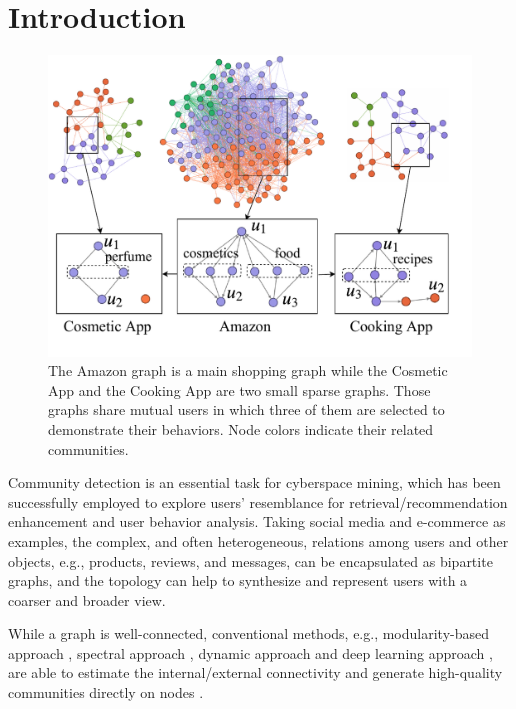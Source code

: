 \section{Introduction}
\begin{figure}  
	\centering
	\includegraphics[width=0.8\columnwidth]{img/chapter4/example.pdf}
	\caption{The Amazon graph is a main shopping graph while the Cosmetic App and the Cooking App are two small sparse graphs. Those graphs share mutual users in which three of them are selected to demonstrate their behaviors. Node colors indicate their related communities. }
	\label{fig:c4_example}
\end{figure}

Community detection is an essential task for cyberspace mining, which has been successfully employed to explore users’ resemblance for retrieval/recommendation enhancement and user behavior analysis. Taking social media and e-commerce as examples, the complex, and often heterogeneous, relations among users and other objects, e.g., products, reviews, and messages, can be encapsulated as bipartite graphs, and the topology can help to synthesize and represent users with a coarser and broader view.

While a graph is well-connected, conventional methods, e.g., modularity-based approach \cite{newman2004fast}, spectral approach \cite{nascimento2011spectral}, dynamic approach \cite{peixoto2017modelling} and deep learning approach \cite{chiang2019cluster}, are able to estimate the internal/external connectivity and generate high-quality communities directly on nodes \cite{fortunato2016community}.

